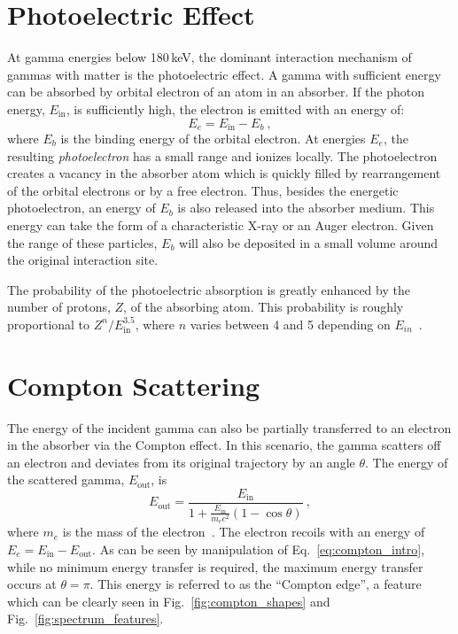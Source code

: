 \section{Photoelectric Effect}
At gamma energies below 180\,keV, the dominant interaction mechanism of gammas with matter is the photoelectric effect. A gamma with sufficient energy can be absorbed by orbital electron of an atom in an absorber. If the photon energy, $E_\text{in}$, is sufficiently high,  the electron is emitted with an energy of: 
\begin{equation}
	E_e = E_\text{in} - E_b~, 
	\label{eq:photoelectric_intro}
\end{equation}
where $E_b$ is the binding energy of the orbital electron. At energies $E_e$, the resulting \textit{photoelectron} has a small range and ionizes locally. The photoelectron creates a vacancy in the absorber atom which is quickly filled by rearrangement of the orbital electrons or by a free electron. Thus, besides the energetic photoelectron, an energy of $E_b$ is also released into the absorber medium. This energy can take the form of a characteristic X-ray or an Auger electron. Given the range of these particles, $E_b$ will also be deposited in a small volume around the original interaction site.

The probability of the photoelectric absorption is greatly enhanced by the number of protons, $Z$, of the absorbing atom. This probability is roughly proportional to $Z^n/E_\text{in}^{3.5}$, where $n$ varies between 4 and 5 depending on $E_{in}$~\cite{knoll}.

\section{Compton Scattering}
The energy of the incident gamma can also be partially transferred to an electron in the absorber via the Compton effect. In this scenario, the gamma scatters off an electron and deviates from its original trajectory by an angle $\theta$. The energy of the scattered gamma, $E_\text{out}$, is
\begin{equation}
	E_\text{out} = \frac{E_\text{in}}{1 + \frac{E_\text{in}}{m_ec^2}(1 - \cos\theta)}~,
	\label{eq:compton_intro}
\end{equation}
where $m_e$ is the mass of the electron~\cite{compton}. The electron recoils with an energy of $E_e = E_\text{in} - E_\text{out}$. As can be seen by manipulation of Eq.~\ref{eq:compton_intro}, while no minimum energy transfer is required, the maximum energy transfer occurs at $\theta = \pi$. This energy is referred to as the ``Compton edge'', a feature which can be clearly seen in Fig.~\ref{fig:compton_shapes} and Fig.~\ref{fig:spectrum_features}.

